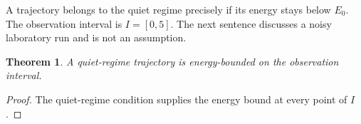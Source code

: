 \documentclass{article}
\newtheorem{theorem}{Theorem}
\begin{document}
A trajectory belongs to the quiet regime precisely if its energy stays below $E_0$.
The observation interval is $I=[0,5]$.
The next sentence discusses a noisy laboratory run and is not an assumption.
\begin{theorem}\label{thm:quiet}
A quiet-regime trajectory is energy-bounded on the observation interval.
\end{theorem}
\begin{proof}
The quiet-regime condition supplies the energy bound at every point of $I$.
\end{proof}
\end{document}
